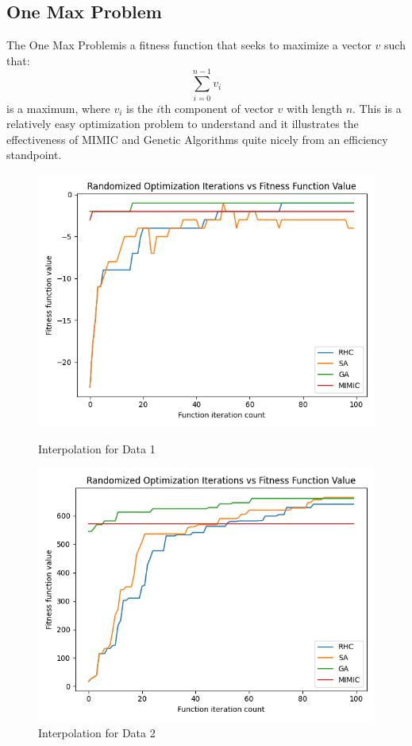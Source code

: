 \documentclass[11pt]{article}
\newcommand{\problemone}{One Max Problem}
\begin{document}
    \subsection{\problemone}
    The \problemone is a fitness function that seeks to maximize a vector $v$ such that:
    \begin{equation}
        \label{oneMax}
        \sum_{i=0}^{n-1} v_i
    \end{equation}
    is a maximum, where $v_i$ is the $i$th component of vector $v$ with length $n$.
    This is a relatively easy optimization problem to understand and it illustrates the effectiveness of MIMIC and Genetic Algorithms
    quite nicely from an efficiency standpoint.
    \linebreak
    \begin{figure}[!htb]
        \begin{minipage}{0.48\textwidth}
            \centering
            \includegraphics[width=.7\linewidth]{eightqueens.png}
            \caption{Interpolation for Data 1}\label{Fig:Data1}
        \end{minipage}\hfill
        \begin{minipage}{0.48\textwidth}
            \centering
            \includegraphics[width=.7\linewidth]{onemax.png}
            \caption{Interpolation for Data 2}\label{Fig:Data2}
        \end{minipage}
    \end{figure}
\end{document}
